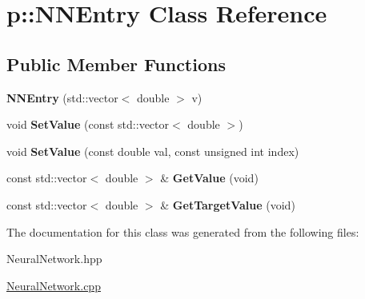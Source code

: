 \hypertarget{classp_1_1NNEntry}{\section{p\-:\-:\-N\-N\-Entry \-Class \-Reference}
\label{classp_1_1NNEntry}
}
\subsection*{\-Public \-Member \-Functions}
\begin{DoxyCompactItemize}
\item 
\hypertarget{classp_1_1NNEntry_a95bd74aa59a7cca3f625ea34ebbf5c57}{{\bfseries \-N\-N\-Entry} (std\-::vector$<$ double $>$ v)}\label{classp_1_1NNEntry_a95bd74aa59a7cca3f625ea34ebbf5c57}

\item 
\hypertarget{classp_1_1NNEntry_a7ceff83ebfec6f3efef432420c4d3132}{void {\bfseries \-Set\-Value} (const std\-::vector$<$ double $>$)}\label{classp_1_1NNEntry_a7ceff83ebfec6f3efef432420c4d3132}

\item 
\hypertarget{classp_1_1NNEntry_a82d648406a25eeed87e9463bd027dc77}{void {\bfseries \-Set\-Value} (const double val, const unsigned int index)}\label{classp_1_1NNEntry_a82d648406a25eeed87e9463bd027dc77}

\item 
\hypertarget{classp_1_1NNEntry_ae78199da911a1d1a5b94318e9ede3861}{const std\-::vector$<$ double $>$ \& {\bfseries \-Get\-Value} (void)}\label{classp_1_1NNEntry_ae78199da911a1d1a5b94318e9ede3861}

\item 
\hypertarget{classp_1_1NNEntry_ac14dcd22c22fda7e0e3fd350910ce0a5}{const std\-::vector$<$ double $>$ \& {\bfseries \-Get\-Target\-Value} (void)}\label{classp_1_1NNEntry_ac14dcd22c22fda7e0e3fd350910ce0a5}

\end{DoxyCompactItemize}


\-The documentation for this class was generated from the following files\-:\begin{DoxyCompactItemize}
\item 
\-Neural\-Network.\-hpp\item 
\hyperlink{NeuralNetwork_8cpp}{\-Neural\-Network.\-cpp}\end{DoxyCompactItemize}
